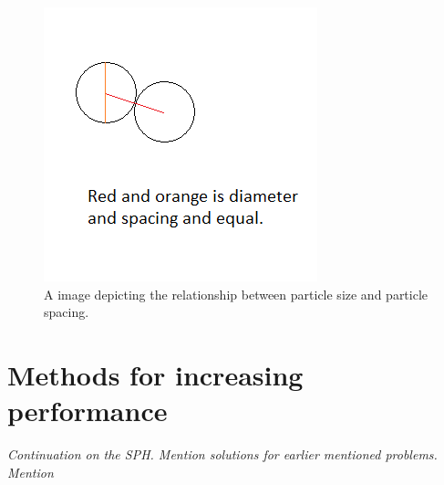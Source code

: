 \documentclass[../../main.tex]{subfiles}
\begin{document}
\begin{figure}[h]
\includegraphics{image/spacing.png}
\caption[Test image]{A image depicting the relationship between particle size and particle spacing.}     
\label{fig:spacing}
\end{figure}

\section{Methods for increasing performance}
{\color{red}\textit{Continuation on the SPH. Mention solutions for earlier mentioned problems. Mention }}
\end{document}
